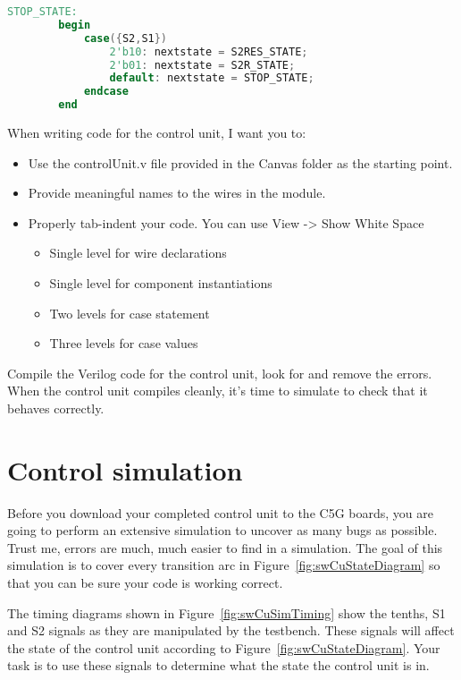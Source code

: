 \begin{lstlisting}[language=Verilog,  frame=single]
	STOP_STATE:
		begin
			case({S2,S1})
				2'b10: nextstate = S2RES_STATE;
				2'b01: nextstate = S2R_STATE;
				default: nextstate = STOP_STATE;
			endcase
		end
\end{lstlisting}

When writing code for the control unit, I want you to:

\begin{itemize}
\item
  Use the controlUnit.v file provided in the Canvas folder as the
  starting point.
\item
  Provide meaningful names to the wires in the module.
\item
  Properly tab-indent your code. You can use View -\textgreater{} Show
  White Space

  \begin{itemize}
  \item
    Single level for wire declarations
  \item
    Single level for component instantiations
  \item
    Two levels for case statement
  \item
    Three levels for case values
  \end{itemize}
\end{itemize}

Compile the Verilog code for the control unit, look for and remove the
errors. When the control unit compiles cleanly, it's time to simulate to
check that it behaves correctly.

\section{Control simulation}

Before you download your completed control unit to the C5G boards, you
are going to perform an extensive simulation to uncover as many bugs as
possible. Trust me, errors are much, much easier to find in a
simulation. The goal of this simulation is to cover every transition arc
in Figure~\ref{fig:swCuStateDiagram} so that you can be sure your code is working correct.

The timing diagrams shown in Figure~\ref{fig:swCuSimTiming} show the tenths,
S1 and S2 signals as they are manipulated by the testbench. These
signals will affect the state of the control unit according to Figure~\ref{fig:swCuStateDiagram}.
Your task is to use these signals to determine what the state the
control unit is in.

